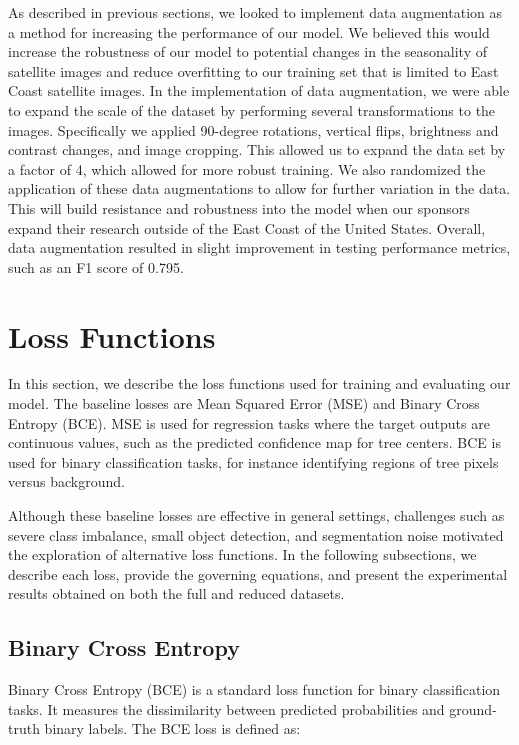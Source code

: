 \documentclass[conference]{ieeetran}
\begin{document}
As described in previous sections, we looked to implement data augmentation as a method for increasing the performance of our model. We believed this would increase the robustness of our model to potential changes in the seasonality of satellite images and reduce overfitting to our training set that is limited to East Coast satellite images. In the implementation of data augmentation, we were able to expand the scale of the dataset by performing several transformations to the images. Specifically we applied 90-degree rotations, vertical flips, brightness and contrast changes, and image cropping. This allowed us to expand the data set by a factor of 4, which allowed for more robust training. We also randomized the application of these data augmentations to allow for further variation in the data. This will build resistance and robustness into the model when our sponsors expand their research outside of the East Coast of the United States. Overall, data augmentation resulted in slight improvement in testing performance metrics, such as an F1 score of 0.795.

 
\section{Loss Functions}

In this section, we describe the loss functions used for training and evaluating our model. The baseline losses are Mean Squared Error (MSE) and Binary Cross Entropy (BCE). MSE is used for regression tasks where the target outputs are continuous values, such as the predicted confidence map for tree centers. BCE is used for binary classification tasks, for instance identifying regions of tree pixels versus background.

Although these baseline losses are effective in general settings, challenges such as severe class imbalance, small object detection, and segmentation noise motivated the exploration of alternative loss functions. In the following subsections, we describe each loss, provide the governing equations, and present the experimental results obtained on both the full and reduced datasets.

\subsection{Binary Cross Entropy}

Binary Cross Entropy (BCE) is a standard loss function for binary classification tasks. It measures the dissimilarity between predicted probabilities and ground-truth binary labels. The BCE loss is defined as:
\end{document}
